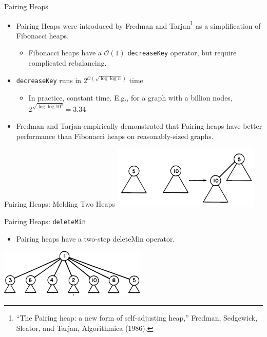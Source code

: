 \documentclass{beamer}
\begin{document}
\begin{frame}{Pairing Heaps}
  \begin{itemize}
    \item Pairing Heaps were introduced by Fredman and Tarjan\footnote{``The Pairing heap: a new form of self-adjusting heap,'' Fredman, Sedgewick, Sleator, and Tarjan, Algorithmica (1986).} as a simplification of Fibonacci heaps.
      \begin{itemize}
        \item Fibonacci heaps have a $\mathcal{O}(1)$ \texttt{decreaseKey} operator, but require complicated rebalancing.
      \end{itemize}
    \item \texttt{decreaseKey} runs in $2^{\mathcal{O}(\sqrt{\log \log n})}$
        time
        \begin{itemize}
          \item In practice, constant time. E.g., for a graph with a billion nodes,
            $2^\sqrt{\log \log 10^9} = 3.34$.
        \end{itemize}
      \item Fredman and Tarjan empirically demonstrated that Pairing heaps have better performance than Fibonacci heaps on reasonably-sized graphs.
  \end{itemize}
\end{frame}

\begin{frame}{Pairing Heaps: Melding Two Heaps}
  \includegraphics[scale=1.0]{img/meld.png}
\end{frame}

\begin{frame}{Pairing Heaps: \texttt{deleteMin}}
  \begin{itemize}
    \item Pairing heaps have a two-step deleteMin operator.
  \end{itemize}
  \includegraphics[scale=1.0]{img/deleteMin1.png}
\end{frame}
\end{document}
